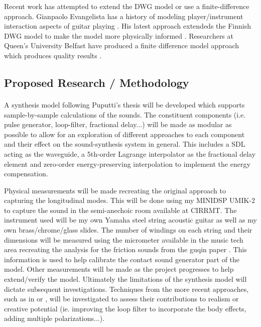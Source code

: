 \documentclass[12pt]{article}
\begin{document}
Recent work has attempted to extend the DWG model or use a finite-difference approach. Gianpaolo Evangelista has a history of modeling player/instrument interaction aspects of guitar playing \cite{evangelista_physical_2011} \cite{evangelista_playerinstrument_2010}. His latest approach extendeds the Finnish DWG model to make the model more physically informed \cite{evangelista_physical_2012}. Researchers at Queen’s University Belfast have produced a finite difference model approach which produces quality results \cite{bhanuprakash_finite_2020}.

\subsection*{Proposed Research / Methodology}
\paragraph{}
A synthesis model following Puputti's thesis will be developed which supports sample-by-sample calculations of the sounds. The constituent components (i.e. pulse generator, loop-filter, fractional delay...) will be made as modular as possible to allow for an exploration of different approaches to each component and their effect on the sound-synthesis system in general. This includes a SDL acting as the waveguide, a 5th-order Lagrange interpolator as the fractional delay element and zero-order energy-preserving interpolation to implement the energy compensation.

Physical measurements will be made recreating the original approach to capturing the longitudinal modes. This will be done using my MINIDSP UMIK-2 to capture the sound in the semi-anechoic room available at CIRRMT. The instrument used will be my own Yamaha steel string acoustic guitar as well as my own brass/chrome/glass slides. The number of windings on each string and their dimensions will be measured using the micrometer available in the music tech area recreating the analysis for the friction sounds from the guqin paper \cite{penttinen_model-based_2006}. This information is used to help calibrate the contact sound generator part of the model. Other measurements will be made as the project progresses to help extend/verify the model. Ultimately the limitations of the synthesis model will dictate subsequent investigations. Techniques from the more recent approaches, such as in \cite{bhanuprakash_finite_2020} or \cite{evangelista_physical_2012}, will be investigated to assess their contributions to realism or creative potential (ie. improving the loop filter to incorporate the body effects, adding multiple polarizations...). 
\end{document}
